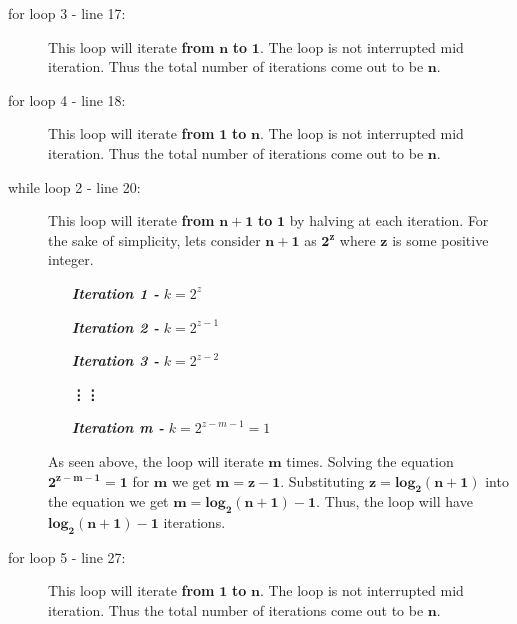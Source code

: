 \documentclass[10pt]{article}
\begin{document}
\begin{description}
    \item[for loop 3 - line 17:] This loop will iterate \textbf{from} $\mathbf{n}$ \textbf{to}  $\mathbf{1}$. The loop is not interrupted mid iteration. Thus the total number of iterations come out to be $\mathbf{n}$. 

    \item[for loop 4 - line 18:] This loop will iterate \textbf{from} $\mathbf{1}$ \textbf{to}  $\mathbf{n}$. The loop is not interrupted mid iteration. Thus the total number of iterations come out to be $\mathbf{n}$. 

   \item[while loop 2 - line 20:] This loop will iterate \textbf{from} $\mathbf{n+1}$ \textbf{to} $\mathbf{1}$ by halving at each iteration. For the sake of simplicity, lets consider $\mathbf{n+1}$ as $\mathbf{2^{z}}$ where $\mathbf{z}$ is some positive integer. 
   \begin{enumerate}[leftmargin=3cm]
       \item[\textit{\textbf{Iteration 1 -}}] ${k = 2^{z}}$
       \item[\textit{\textbf{Iteration 2 -}}] ${k = 2^{z-1}}$
       \item[\textit{\textbf{Iteration 3 -}}] ${k = 2^{z-2}}$
       \item[]\hspace{-1.5cm}\textbf{\vdots}\hspace{2cm}\textbf{\vdots}
       \item[\textit{\textbf{Iteration m -}}] ${k = 2^{z-m-1} = 1}$
   \end{enumerate}
 As seen above, the loop will iterate $\mathbf{m}$ times. Solving the equation $\mathbf{2^{z-m-1} = 1}$ for $\mathbf{m}$ we get $\mathbf{m = z - 1}$. Substituting $\mathbf{z = log_2(n+1)}$ into the equation we get $\mathbf{m = log_2(n+1) - 1}$. Thus, the loop will have $\mathbf{log_2(n+1) - 1}$ iterations. \par


\item[for loop 5 - line 27:] This loop will iterate \textbf{from} $\mathbf{1}$ \textbf{to} $\mathbf{n}$. The loop is not interrupted mid iteration. Thus the total number of iterations come out to be $\mathbf{n}$. 


\end{description}
\end{document}
